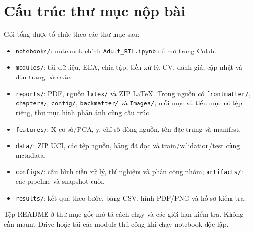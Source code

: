 \section{Cấu trúc thư mục nộp bài}
\label{sec:A_2}
Gói tổng được tổ chức theo các thư mục sau:
\begin{itemize}
\item \texttt{notebooks/}: notebook chính \texttt{Adult\_BTL.ipynb} để mở trong Colab.
\item \texttt{modules/}: tải dữ liệu, EDA, chia tập, tiền xử lý, CV, đánh giá, cập nhật và dàn trang báo cáo.
\item \texttt{reports/}: PDF, nguồn \texttt{latex/} và ZIP LaTeX. Trong nguồn có \texttt{frontmatter/}, \texttt{chapters/}, \texttt{config/}, \texttt{backmatter/} và \texttt{Images/}; mỗi mục và tiểu mục có tệp riêng, thư mục hình phản ánh cùng cấu trúc.
\item \texttt{features/}: X cơ sở/PCA, y, chỉ số dòng nguồn, tên đặc trưng và manifest.
\item \texttt{data/}: ZIP UCI, các tệp nguồn, bảng đã đọc và train/validation/test cùng metadata.
\item \texttt{configs/}: cấu hình tiền xử lý, thí nghiệm và phân công nhóm; \texttt{artifacts/}: các pipeline và snapshot cuối.
\item \texttt{results/}: kết quả theo bước, bảng CSV, hình PDF/PNG và hồ sơ kiểm tra.
\end{itemize}
Tệp README ở thư mục gốc mô tả cách chạy và các giới hạn kiểm tra. Không cần mount Drive hoặc tải các module thủ công khi chạy notebook độc lập.
